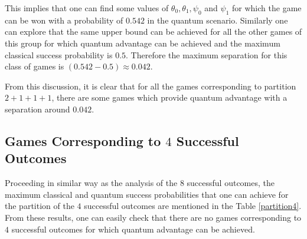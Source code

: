 \documentclass[]{svjour3}
\begin{document}
This implies that one can find some values of $\theta_0, \theta_1, \psi_0$ and $\psi_1$ for which the game can be won with a probability of $0.542$ in the quantum scenario. Similarly one can explore that the same upper bound can be achieved for all the other games of this group for which quantum advantage can be achieved and the maximum classical success probability is $0.5$.
Therefore the maximum separation for this class of games is $(0.542 - 0.5) \approx 0.042$.


From this discussion, it is clear that for all the games corresponding to partition $2+1+1+1$, there are some games which provide quantum advantage with a separation around $0.042$. 

\subsection{Games Corresponding to $4$ Successful Outcomes}


Proceeding in similar way as the analysis of the $8$ successful outcomes, the maximum classical and quantum success probabilities that one can achieve for the partition of the $4$ successful outcomes are mentioned in the Table \ref{partition4}. From these results, one can easily check that there are no games corresponding to $4$ successful outcomes for which quantum advantage can be achieved.

\begin{table}[htb]
	\begin{center}
		\setlength{\tabcolsep}{0.35em}
	\end{center}
	\caption{Analysis of partition for $4$ successful outcomes} 
	\label{partition4}
\end{table}
\end{document}
